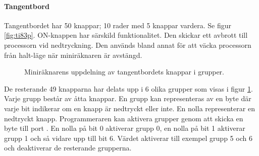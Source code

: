 \documentclass[main.tex]{subfiles}
\begin{document}
\paragraph{Tangentbord}
Tangentbordet har 50 knappar; 10 rader med 5 knappar vardera. Se figur
\ref{fig:ti83p}. ON-knappen har särskild funktionalitet. Den skickar ett
avbrott till processorn vid nedtryckning. Den används bland annat för att väcka
processorn från halt-läge när miniräknaren är avstängd.

\begin{figure}
    \center
    \caption{Miniräknarens uppdelning av tangentbordets knappar i grupper.}
    \label{fig:keygroups}
\end{figure}

De resterande 49 knapparna har delats upp i 6 olika grupper som visas i figur
\ref{fig:keygroups}. Varje grupp består av åtta knappar. En grupp kan
representeras av en byte där varje bit indikerar om en knapp är nedtryckt eller
inte. En nolla representerar en nedtryckt knapp. Programmeraren kan aktivera
grupper genom att skicka en byte till port . En nolla på bit 0
aktiverar grupp 0, en nolla på bit 1 aktiverar grupp 1 och så vidare upp till
bit 6. Värdet  aktiverar till exempel grupp 5 och 6 och
deaktiverar de resterande grupperna.
\end{document}
